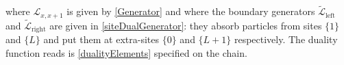 \documentclass[10pt]{article}
\numberwithin{equation}{section}
\numberwithin{equation}{subsection}
\begin{document}
where $\mathcal{L}_{x,x+1}$ is given by \eqref{Generator} and where the boundary generators $\widetilde{\mathcal{L}}_{\text{left}}$ and $\widetilde{\mathcal{L}}_{\text{right}}$ are given in \eqref{siteDualGenerator}: they absorb particles from sites $\{1\}$ and $\{L\}$ and put them at extra-sites $\{0\}$ and $\{L+1\}$ respectively. The duality function reads is \eqref{dualityElements} specified on the chain. 
\begin{comment}
\begin{equation}\label{abs-dual-boundary-chain}
	\begin{split}
		\widetilde{\mathcal{L}}_{\text{left}}f(\bm{\xi})&=|\alpha|\sum_{a=1}^{N-1}\xi_{a}^{1}\left(f(\bm{\xi}-\bm{\delta}_{a}^{1}+\bm{\delta}_{N}^{1}+\bm{\delta}_{a}^{0})f(\bm{\xi})\right)\\\widetilde{\mathcal{L}}_{\text{right}}f(\bm{\xi})&=|\beta|\sum_{a=1}^{N-1}\xi_{a}^{L}\left(f(\bm{\xi}-\bm{\delta}_{a}^{L}+\bm{\delta}_{N}^{L}+\bm{\delta}_{a}^{L+1})-f(\bm{\xi})\right)
	\end{split}
\end{equation}
where $0$ and $L+1$ are the extra-sites.
\end{comment} 
\begin{comment}
, i.e.
\begin{equation}\label{dualityFunctionChain}
	D(\bm{n},\bm{\xi})=\prod_{a=1}^{N-1}\left(\rho_{a}^{L}\right)^{\xi_{a}^{0}}\prod_{x=1}^{L}\frac{(\nu-\sum_{a=1}^{N-1}\xi_{a}^{x})!}{\nu!}\prod_{a=1}^{N-1}\frac{\eta_{a}^{x}!}{(n_{a}^{x}-\xi_{a}^{x})!}\prod_{a=1}^{N-1}\left(\rho_{a}^{R}\right)^{\xi_{a}^{L+1}}
\end{equation}
where $\rho_{\alpha}^{L}=\frac{\alpha_{a}}{|\alpha|}$ and where $\rho_{\alpha}^{R}=\frac{\beta_{a}}{|\beta|}$.\\
\end{comment}
\end{document}
